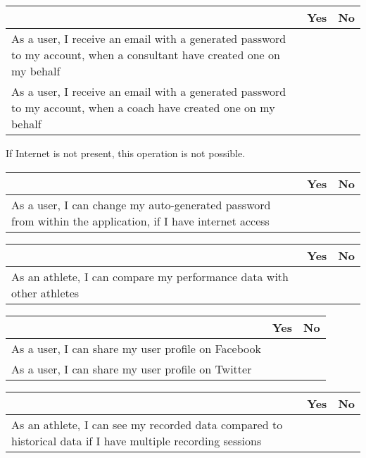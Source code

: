 
\begin{tabularx}{\textwidth}{|b|c|c|}
	\hline
	 & Yes & No \\
	\hline
	As a user, I receive an email with a generated password to my account, when a consultant have created one on my behalf & \xmark & \\
	\hline
	As a user, I receive an email with a generated password to my account, when a coach have created one on my behalf & \xmark & \\
	\hline
\end{tabularx}


If Internet is not present, this operation is not possible.

\begin{tabularx}{\textwidth}{|b|c|c|}
	\hline
	 & Yes & No \\
	\hline
	As a user, I can change my auto-generated password from within the application, if I have internet access & \xmark & \\
	\hline
\end{tabularx}


\begin{tabularx}{\textwidth}{|b|c|c|}
	\hline
	 & Yes & No \\
	\hline
	As an athlete, I can compare my performance data with other athletes &   & \xmark  \\
	\hline
\end{tabularx}


\begin{tabularx}{\textwidth}{|b|c|c|}
	\hline
	 & Yes & No \\
	\hline
	As a user, I can share my user profile on Facebook &   & \xmark  \\
	\hline
	As a user, I can share my user profile on Twitter &   & \xmark  \\
	\hline
\end{tabularx}


\begin{tabularx}{\textwidth}{|b|c|c|}
	\hline
	 & Yes & No \\
	\hline
	As an athlete, I can see my recorded data compared to historical data if I have multiple recording sessions &   & \xmark  \\
	\hline
\end{tabularx}
